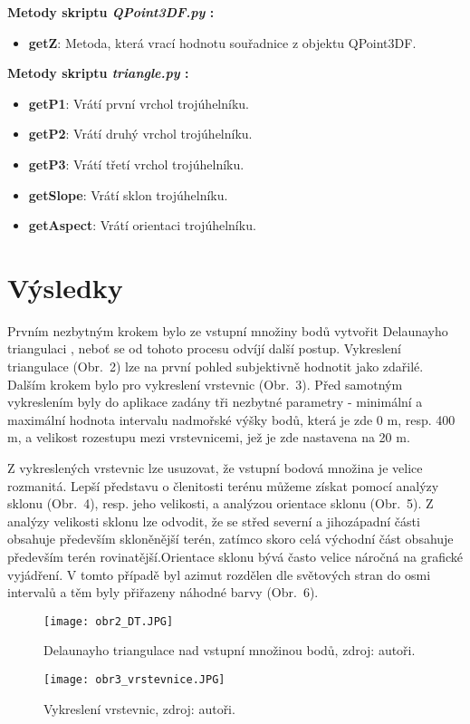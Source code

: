 \documentclass[a4paper,12pt]{article}
\begin{document}
{{{{{{{{{{{    \textbf{Metody skriptu \emph{QPoint3DF.py} :}
    \begin{itemize}
    \item \textbf{getZ}: Metoda, která vrací hodnotu souřadnice z objektu QPoint3DF.
    \end{itemize}

    \textbf{Metody skriptu \emph{triangle.py} :}
    \begin{itemize}
    \item \textbf{getP1}: Vrátí první vrchol trojúhelníku.
    \item \textbf{getP2}: Vrátí druhý vrchol trojúhelníku.
    \item \textbf{getP3}: Vrátí třetí vrchol trojúhelníku.
    \item \textbf{getSlope}: Vrátí sklon trojúhelníku.
    \item \textbf{getAspect}: Vrátí orientaci trojúhelníku.
    \end{itemize}

    \section{Výsledky}
    Prvním nezbytným krokem bylo ze vstupní množiny bodů vytvořit Delaunayho triangulaci , neboť se od tohoto procesu odvíjí další postup. Vykreslení triangulace (Obr.~2) lze na první pohled subjektivně hodnotit jako zdařilé. Dalším krokem bylo pro vykreslení vrstevnic (Obr.~3). Před samotným vykreslením byly do aplikace zadány tři nezbytné parametry - minimální a maximální hodnota intervalu nadmořské výšky bodů, která je zde 0 m, resp. 400 m, a velikost rozestupu mezi vrstevnicemi, jež je zde nastavena na 20 m.

    Z vykreslených vrstevnic lze usuzovat, že vstupní bodová množina je velice rozmanitá. Lepší představu o členitosti terénu můžeme získat pomocí analýzy sklonu (Obr.~4), resp. jeho velikosti, a analýzou orientace sklonu (Obr.~5). Z analýzy velikosti sklonu lze odvodit, že se střed severní a jihozápadní části obsahuje především skloněnější terén, zatímco skoro celá východní část obsahuje především terén rovinatější.Orientace sklonu bývá často velice náročná na grafické vyjádření. V tomto případě byl azimut rozdělen dle světových stran do osmi intervalů a těm byly přiřazeny náhodné barvy (Obr.~6).

    \begin{figure}[htbp]
    \texttt{[image: obr2\_DT.JPG]}
    \centering
    \caption{Delaunayho triangulace nad vstupní množinou bodů, zdroj: autoři.}
    \label{fig:obr2}
    \end{figure}
    \clearpage
    \begin{figure}[htbp]
    \texttt{[image: obr3\_vrstevnice.JPG]}
    \centering
    \caption{Vykreslení vrstevnic, zdroj: autoři.}
    \label{fig:obr3}
    

\end{figure}}}}}}}}}}}}
\end{document}
